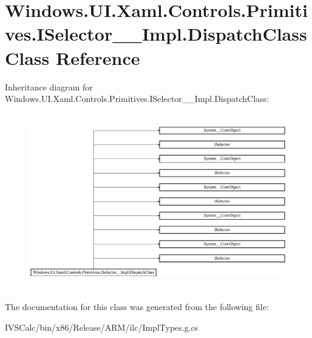 \hypertarget{class_windows_1_1_u_i_1_1_xaml_1_1_controls_1_1_primitives_1_1_i_selector_____impl_1_1_dispatch_class}{}\section{Windows.\+U\+I.\+Xaml.\+Controls.\+Primitives.\+I\+Selector\+\_\+\+\_\+\+Impl.\+Dispatch\+Class Class Reference}
\label{class_windows_1_1_u_i_1_1_xaml_1_1_controls_1_1_primitives_1_1_i_selector_____impl_1_1_dispatch_class}
Inheritance diagram for Windows.\+U\+I.\+Xaml.\+Controls.\+Primitives.\+I\+Selector\+\_\+\+\_\+\+Impl.\+Dispatch\+Class\+:\begin{figure}[H]
\begin{center}
\leavevmode
\includegraphics[height=7.700000cm]{class_windows_1_1_u_i_1_1_xaml_1_1_controls_1_1_primitives_1_1_i_selector_____impl_1_1_dispatch_class}
\end{center}
\end{figure}


The documentation for this class was generated from the following file\+:\begin{DoxyCompactItemize}
\item 
I\+V\+S\+Calc/bin/x86/\+Release/\+A\+R\+M/ilc/Impl\+Types.\+g.\+cs\end{DoxyCompactItemize}
